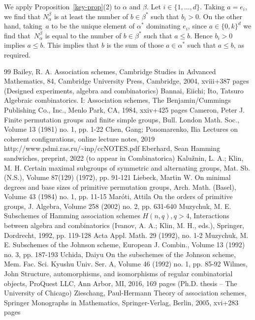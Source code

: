 \documentclass[10pt]{article}
\begin{document}
We apply Proposition~\ref{key-prop}(2) to $\alpha$ and $\beta$.
Let $i \in \{1, \dots, d\}$.
Taking $a = e_i$, we find that $N^\beta_\alpha$ is at least the number of $b \in \beta^*$ such that $b_i > 0$.
On the other hand, taking~$a$ to be the unique element of $\alpha^*$ dominating $e_i$,
since $a \in \{0,k\}^d$ we find that~$N^\beta_\alpha$ is equal to the number of $b \in \beta^*$ such that $a \le b$.
Hence $b_i > 0$ implies $a \le b$.
This implies that $b$ is the sum of those $a \in \alpha^*$ such that $a \le b$, as required.

\begin{thebibliography}{99}
Bailey, R. A. Association schemes, Cambridge Studies in Advanced Mathematics, 84, Cambridge University Press, Cambridge, 2004, xviii+387 pages (Designed experiments, algebra and combinatorics)
Bannai, Eiichi; Ito, Tatsuro Algebraic combinatorics. I: Association schemes, The Benjamin/Cummings Publishing Co., Inc., Menlo Park, CA, 1984, xxiv+425 pages
Cameron, Peter J. Finite permutation groups and finite simple groups, Bull. London Math. Soc., Volume 13 (1981) no. 1, pp. 1-22
Chen, Gang; Ponomarenko, Ilia Lectures on coherent configurations, online lecture notes, 2019 http://www.pdmi.ras.ru/\textasciitilde{}inp/ccNOTES.pdf
Eberhard, Sean Hamming sandwiches, preprint, 2022 (to appear in Combinatorica)
Kalužnin, L. A.; Klin, M. H. Certain maximal subgroups of symmetric and alternating groups, Mat. Sb. (N.S.), Volume 87(129) (1972), pp. 91-121
Liebeck, Martin W. On minimal degrees and base sizes of primitive permutation groups, Arch. Math. (Basel), Volume 43 (1984) no. 1, pp. 11-15
Maróti, Attila On the orders of primitive groups, J. Algebra, Volume 258 (2002) no. 2, pp. 631-640
Muzychuk, M. E. Subschemes of Hamming association schemes \(H(n,q), q>4\), Interactions between algebra and combinatorics (Ivanov, A. A.; Klin, M. H., eds.), Springer, Dordrecht, 1992, pp. 119-128 Acta Appl. Math. 29 (1992), no. 1-2
Muzychuk, M. E. Subschemes of the Johnson scheme, European J. Combin., Volume 13 (1992) no. 3, pp. 187-193
Uchida, Daiyu On the subschemes of the Johnson scheme, Mem. Fac. Sci. Kyushu Univ. Ser. A, Volume 46 (1992) no. 1, pp. 85-92
Wilmes, John Structure, automorphisms, and isomorphisms of regular combinatorial objects, ProQuest LLC, Ann Arbor, MI, 2016, 169 pages (Ph.D. thesis – The University of Chicago)
Zieschang, Paul-Hermann Theory of association schemes, Springer Monographs in Mathematics, Springer-Verlag, Berlin, 2005, xvi+283 pages
\end{thebibliography}
\end{document}
